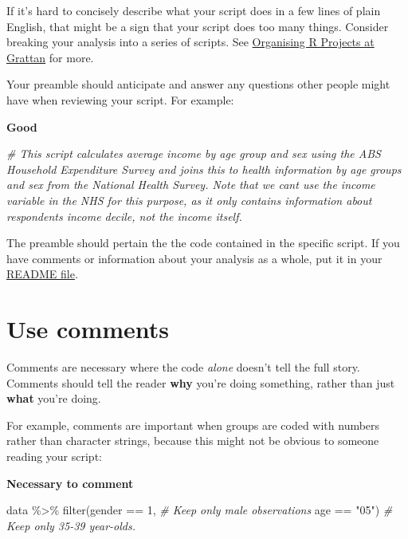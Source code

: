 \documentclass[
]{book}
\newenvironment{Shaded}{\begin{snugshade}}{\end{snugshade}}
\newcommand{\CommentTok}[1]{\textcolor[rgb]{0.56,0.35,0.01}{\textit{#1}}}
\newcommand{\DecValTok}[1]{\textcolor[rgb]{0.00,0.00,0.81}{#1}}
\newcommand{\FunctionTok}[1]{\textcolor[rgb]{0.00,0.00,0.00}{#1}}
\newcommand{\NormalTok}[1]{#1}
\newcommand{\SpecialCharTok}[1]{\textcolor[rgb]{0.00,0.00,0.00}{#1}}
\newcommand{\StringTok}[1]{\textcolor[rgb]{0.31,0.60,0.02}{#1}}
\begin{document}
If it's hard to concisely describe what your script does in a few lines of plain English, that might be a sign that your script does too many things. Consider breaking your analysis into a series of scripts. See \protect\hyperlink{organising-projects}{Organising R Projects at Grattan} for more.

Your preamble should anticipate and answer any questions other people might have when reviewing your script. For example:

\textbf{Good}

\begin{Shaded}
\begin{Highlighting}[]
\CommentTok{\# This script calculates average income by age group and sex using the ABS Household Expenditure Survey and joins this to health information by age groups and sex from the National Health Survey. Note that we can\textquotesingle{}t use the income variable in the NHS for this purpose, as it only contains information about respondents\textquotesingle{} income decile, not the income itself.}
\end{Highlighting}
\end{Shaded}

The preamble should pertain the the code contained in the specific script. If you have comments or information about your analysis as a whole, put it in your \protect\hyperlink{README}{README file}.

\hypertarget{use-comments}{%
\section{Use comments}\label{use-comments}}

Comments are necessary where the code \emph{alone} doesn't tell the full story. Comments should tell the reader \textbf{why} you're doing something, rather than just \textbf{what} you're doing.

For example, comments are important when groups are coded with numbers rather than character strings, because this might not be obvious to someone reading your script:

\textbf{Necessary to comment}

\begin{Shaded}
\begin{Highlighting}[]
\NormalTok{data }\SpecialCharTok{\%\textgreater{}\%} 
  \FunctionTok{filter}\NormalTok{(gender }\SpecialCharTok{==} \DecValTok{1}\NormalTok{,   }\CommentTok{\# Keep only male observations}
\NormalTok{         age }\SpecialCharTok{==} \StringTok{"05"}\NormalTok{)   }\CommentTok{\# Keep only 35{-}39 year{-}olds. }
\end{Highlighting}
\end{Shaded}
\end{document}
